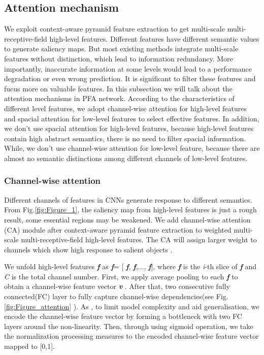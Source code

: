 \documentclass[10pt,twocolumn,letterpaper]{article}
\begin{document}
\subsection{Attention mechanism}
We exploit context-aware pyramid feature extraction to get multi-scale multi-receptive-field high-level features. Different features have different semantic values to generate saliency maps. But most existing methods integrate multi-scale features without distinction, which lead to information redundancy. More importantly, inaccurate information at some levels would lead to a performance degradation or even wrong prediction. It is significant to filter these features and fucus more on valuable features. In this subsection we will talk about the attention mechanisms in PFA network. According to the characteristics of different level features, we adopt channel-wise attention for high-level features and spacial attention for low-level features to select effective features. In addition, we don't use spacial attention for high-level features, because  high-level features contain high abstract semantics\cite{senet,pagrn}, there is no need to filter spacial information. While, we don't use channel-wise attention for low-level feature, because there are almost no semantic distinctions among different channels of low-level features.

\subsubsection{Channel-wise attention}
 Different channels of features in CNNs generate response to different semantics\cite{senet}. From Fig.\ref{fig:Figure_1}, the saliency map from high-level features is just a rough result, some essential regions may be weakened. We add channel-wise attention (CA) \cite{senet,scacaption} module after context-aware pyramid feature extraction to weighted multi-scale multi-receptive-field high-level features. The CA will assign larger weight to channels which show high response to salient objects . 

We unfold high-level features \textbf{\emph{f}}   as  \textbf{\emph{f}}= [ \textbf{\emph{f}}, \textbf{\emph{f}},..., \textbf{\emph{f}}], where  \textbf{\emph{f}}   is the \emph{i}-th slice of \textbf{\emph{f}} and \emph{C} is the total channel number. First, we apply average pooling to each \textbf{\emph{f}} to obtain a channel-wise feature vector \textbf{\emph{v}}  . After that, two consecutive fully connected(FC) layer to fully capture channel-wise dependencies(see Fig.\ref {fig:Figure_attention} ). As \cite{senet}, to limit model complexity and aid generalisation, we encode the channel-wise feature vector by forming a bottleneck with two FC layers around the non-linearity. Then, through using sigmoid operation, we take the normalization processing measures to the encoded channel-wise feature vector mapped to [0,1].
\end{document}
